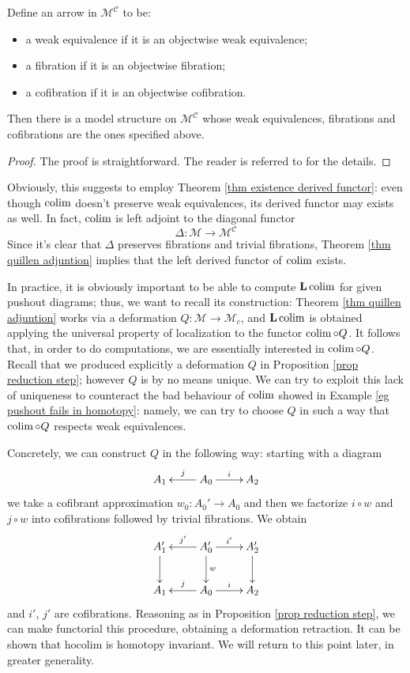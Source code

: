 \begin{refsection}
\begin{lemma}
Define an arrow in $\mathcal M^{\mathcal C}$ to be:
\begin{itemize}
\item a weak equivalence if it is an objectwise weak equivalence;
\item a fibration if it is an objectwise fibration;
\item a cofibration if it is an objectwise cofibration.
\end{itemize}
Then there is a model structure on $\mathcal M^{\mathcal C}$ whose weak equivalences, fibrations and cofibrations are the ones specified above.
\end{lemma}

\begin{proof}
The proof is straightforward. The reader is referred to \cite[Section 10]{dwsp} for the details.
\end{proof}

Obviously, this suggests to employ Theorem \ref{thm existence derived functor}: even though $\operatorname*{colim}$ doesn't preserve weak equivalences, its derived functor may exists as well. In fact, $\operatorname*{colim}$ is left adjoint to the diagonal functor
\[
\Delta \colon \mathcal M \to \mathcal M^{\mathcal C}
\]
Since it's clear that $\Delta$ preserves fibrations and trivial fibrations, Theorem \ref{thm quillen adjuntion} implies that the left derived functor of $\operatorname*{colim}$ exists.

In practice, it is obviously important to be able to compute $\mathbf L \operatorname*{colim}$ for given pushout diagrams; thus, we want to recall its construction: Theorem \ref{thm quillen adjuntion} works via a deformation $Q \colon \mathcal M \to \mathcal M_c$, and $\mathbf L \operatorname*{colim}$ is obtained applying the universal property of localization to the functor $\operatorname*{colim} \circ Q$. It follows that, in order to do computations, we are essentially interested in $\operatorname*{colim} \circ Q$. Recall that we produced explicitly a deformation $Q$ in Proposition \ref{prop reduction step}; however $Q$ is by no means unique. We can try to exploit this lack of uniqueness to counteract the bad behaviour of $\operatorname*{colim}$ showed in Example \ref{eg pushout fails in homotopy}: namely, we can try to choose $Q$ in such a way that $\operatorname*{colim} \circ Q$ respects weak equivalences.

Concretely, we can construct $Q$ in the following way: starting with a diagram
\[
\xymatrix{ A_1 & A_0 \ar[l]_j \ar[r]^i & A_2 }
\]
we take a cofibrant approximation $w_0 \colon A_0' \to A_0$ and then we factorize $i \circ w$ and $j \circ w$ into cofibrations followed by trivial fibrations. We obtain
\[
\xymatrix{
A_1' \ar[d] & A_0' \ar[l]_{j'} \ar[d]^w \ar[r]^{i'} & A_2' \ar[d] \\ A_1 & A_0 \ar[l]_j \ar[r]^i & A_2
}
\]
and $i'$, $j'$ are cofibrations. Reasoning as in Proposition \ref{prop reduction step}, we can make functorial this procedure, obtaining a deformation retraction. It can be shown that $\mathrm{hocolim}$ is homotopy invariant. We will return to this point later, in greater generality.


\end{refsection}
